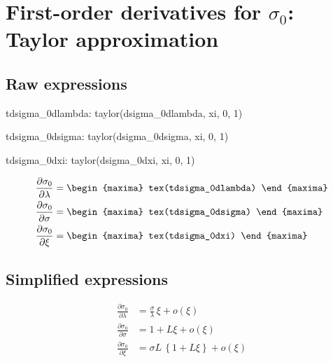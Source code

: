\section{First-order derivatives for $\sigma_0$: Taylor approximation}

\subsection*{Raw expressions}
\begin{maxima}
  tdsigma_0dlambda: taylor(dsigma_0dlambda, xi, 0, 1)
\end{maxima}
\begin{maxima}
  tdsigma_0dsigma: taylor(dsigma_0dsigma, xi, 0, 1)
\end{maxima}
\begin{maxima}
  tdsigma_0dxi: taylor(dsigma_0dxi, xi, 0, 1)
\end{maxima}

{\color{MonVertF}
\begin{align*}
  \frac{\partial \sigma_0}{\partial \lambda}
  &=
\begin{maxima}
  tex(tdsigma_0dlambda)
\end{maxima}\\
 \frac{\partial \sigma_0}{\partial \sigma}
  &=
\begin{maxima}
  tex(tdsigma_0dsigma)
\end{maxima}\\
\frac{\partial \sigma_0 }{\partial \xi}
  &=
\begin{maxima}
  tex(tdsigma_0dxi)
\end{maxima}
\end{align*}
}

\subsection*{Simplified expressions}

{\color{red}
\begin{align*}
  \frac{\partial \sigma_0}{\partial \lambda}
  &= \frac{\sigma}{\lambda} \, \xi + o(\xi)\\
 \frac{\partial \sigma_0}{\partial \sigma}
  &= 1 + L \xi + o(\xi)\\
\frac{\partial \sigma_0 }{\partial \xi}
  &= \sigma L \, \left\{ 1 + L \xi \right\} +  o(\xi)
\end{align*}
}

